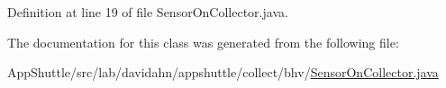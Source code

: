 \-Definition at line 19 of file \-Sensor\-On\-Collector.\-java.



\-The documentation for this class was generated from the following file\-:\begin{DoxyCompactItemize}
\item 
\-App\-Shuttle/src/lab/davidahn/appshuttle/collect/bhv/\hyperlink{_sensor_on_collector_8java}{\-Sensor\-On\-Collector.\-java}\end{DoxyCompactItemize}
